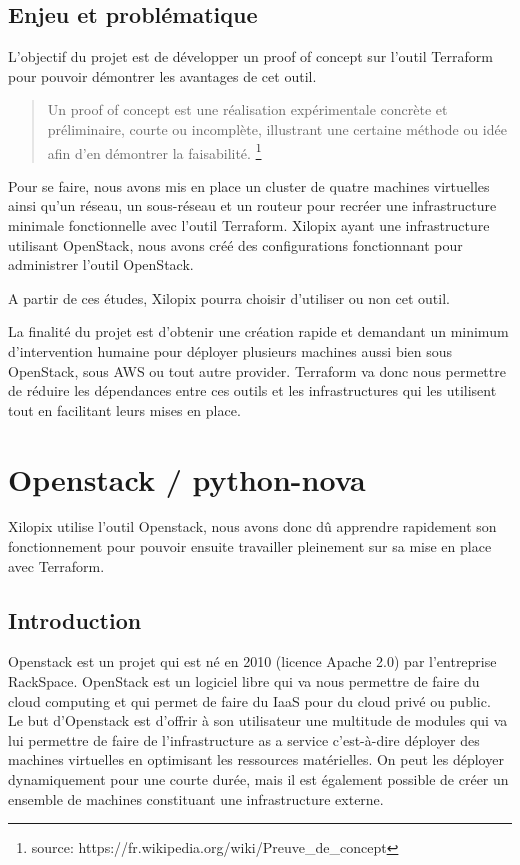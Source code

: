 \documentclass[]{article}
\begin{document}
\subsection{Enjeu et problématique}\label{enjeu-et-probluxe9matique}

L'objectif du projet est de développer un proof of concept sur l'outil
Terraform pour pouvoir démontrer les avantages de cet outil.

\begin{quote}
Un proof of concept est une réalisation expérimentale concrète et
préliminaire, courte ou incomplète, illustrant une certaine méthode ou
idée afin d'en démontrer la faisabilité. \footnote{source: https://fr.wikipedia.org/wiki/Preuve\_de\_concept}
\end{quote}

Pour se faire, nous avons mis en place un cluster de quatre machines
virtuelles ainsi qu'un réseau, un sous-réseau et un routeur pour recréer
une infrastructure minimale fonctionnelle avec l'outil Terraform.
Xilopix ayant une infrastructure utilisant OpenStack, nous avons créé
des configurations fonctionnant pour administrer l'outil OpenStack.

A partir de ces études, Xilopix pourra choisir d'utiliser ou non cet
outil.

La finalité du projet est d'obtenir une création rapide et demandant un
minimum d'intervention humaine pour déployer plusieurs machines aussi
bien sous OpenStack, sous AWS ou tout autre provider. Terraform va donc
nous permettre de réduire les dépendances entre ces outils et les
infrastructures qui les utilisent tout en facilitant leurs mises en place.

\newpage
\section{Openstack / python-nova}\label{openstack-python-nova}

Xilopix utilise l'outil Openstack, nous avons donc dû apprendre
rapidement son fonctionnement pour pouvoir ensuite travailler pleinement
sur sa mise en place avec Terraform.

\subsection{Introduction}\label{introduction-1}

Openstack est un projet qui est né en 2010 (licence Apache 2.0) par
l'entreprise RackSpace. OpenStack est un logiciel libre qui va nous
permettre de faire du cloud computing et qui permet de faire du IaaS
pour du cloud privé ou public.\\
Le but d'Openstack est d'offrir à son
utilisateur une multitude de modules qui va lui permettre de faire de
l'infrastructure as a service c'est-à-dire déployer des machines
virtuelles en optimisant les ressources matérielles. On peut les
déployer dynamiquement pour une courte durée, mais il est également
possible de créer un ensemble de machines constituant une
infrastructure externe.
\end{document}
